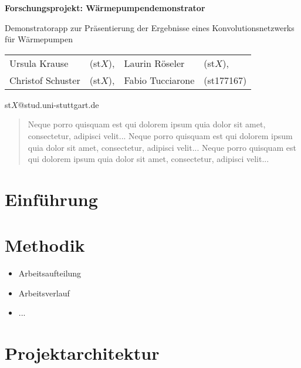 \documentclass[a4paper]{extarticle}
\begin{document}
    \begin{center}
        \huge
        \textbf{Forschungsprojekt: Wärmepumpendemonstrator}
            
        \vspace{0.4cm}
        \large
        Demonstratorapp zur Präsentierung der Ergebnisse eines Konvolutionsnetzwerks für Wärmepumpen
            
        \vspace{0.6cm}
        \normalsize
        \begin{tabular}{llll}
            Ursula Krause & (st$X$), & Laurin Röseler & (st$X$),\\
            Christof Schuster & (st$X$), & Fabio Tucciarone & (st177167)
        \end{tabular}

        \vspace{0.3cm}
        st$X$@stud.uni-stuttgart.de
        
        \vspace{0.8cm}
    \end{center}

    \begin{abstract}
        Neque porro quisquam est qui dolorem ipsum quia dolor sit amet, consectetur, adipisci velit...
        Neque porro quisquam est qui dolorem ipsum quia dolor sit amet, consectetur, adipisci velit...
        Neque porro quisquam est qui dolorem ipsum quia dolor sit amet, consectetur, adipisci velit...
    \end{abstract}

    \section{Einführung}

    \section{Methodik}
    \begin{itemize}
        \item Arbeitsaufteilung
        \item Arbeitsverlauf
        \item ...
    \end{itemize}

    \section{Projektarchitektur}
\end{document}
